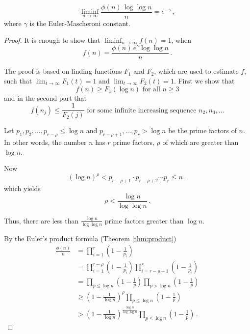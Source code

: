 \documentclass{article}
\begin{document}
\begin{theorem}
\begin{equation*}
    \liminf_{n \rightarrow \infty}{\frac{\phi(n)\,\log\log n}{n}}=e^{-\gamma}\,,
\end{equation*}
where $\gamma$ is the Euler-Mascheroni constant.

\begin{proof}

It is enough to show that $\liminf_{n\rightarrow\infty}f(n) = 1$, when
\begin{equation*}
    f(n)= \frac{\phi(n)\,e^\gamma \log\log n}{n}\,.
\end{equation*}

The proof is based on finding functions $F_1$ and $F_2$, which are used to estimate $f$, such that $\lim_{t\rightarrow \infty} F_1(t) = 1$ and $\lim_{t\rightarrow \infty} F_2(t) = 1$. First we show that 
\begin{equation}
\label{eq:first}
    f(n) \geq F_1(\log n)\text{ for all }n\geq 3
\end{equation}
and in the second part that
\begin{equation}
\label{eq:second}
    f(n_j) \leq \frac{1}{F_2(j)}\text{ for some infinite increasing sequence }n_2, n_3,\dots
\end{equation}

Let $p_1,p_2,\dots,p_{r-\rho} \leq \log n$ and $p_{r-\rho+1},\dots,p_r > \log n$ be the prime factors of $n$. In other words, the number $n$ has $r$ prime factors, $\rho$ of which are greater than $\log n$.

Now
\begin{equation*}
    (\log n)^\rho < p_{r-\rho+1} \cdot p_{r-\rho+2} \cdots p_r \leq n\,,
\end{equation*}
which yields
\begin{equation*}
    \rho < \frac{\log n}{\log\log n}\,.
\end{equation*}

Thus, there are less than $\frac{\log n}{\log\log n}$ prime factors greater than $\log n$.

By the Euler's product formula (Theorem \ref{thm:product})
\begin{align*}
    \frac{\phi(n)}{n} & = \prod_{i=1}^r\left(1-\frac{1}{p_i}\right)\\
    & = \prod_{i=1}^{r-\rho}\left(1-\frac{1}{p_i}\right) \prod_{i=r-\rho+1}^r\left(1-\frac{1}{p_i}\right)\\
    & = \prod_{p\leq\log n}\left(1-\frac{1}{p}\right) \prod_{p>\log n}\left(1-\frac{1}{p}\right)\\
    & \geq \left(1-\frac{1}{\log n}\right)^\rho \prod_{p\leq\log n}\left(1-\frac{1}{p}\right) \\
    & > \left(1-\frac{1}{\log n}\right)^\frac{\log n}{\log \log n} \prod_{p\leq\log n}\left(1-\frac{1}{p}\right)\,.
\end{align*}


\end{proof}
\end{theorem}
\end{document}
